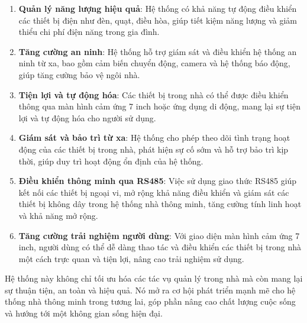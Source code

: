 \begin{enumerate}
    \item \textbf{Quản lý năng lượng hiệu quả}: Hệ thống có khả năng tự động điều khiển các thiết bị điện như đèn, quạt, điều hòa, giúp tiết kiệm năng lượng và giảm thiểu chi phí điện năng trong gia đình.
    \item \textbf{Tăng cường an ninh}: Hệ thống hỗ trợ giám sát và điều khiển hệ thống an ninh từ xa, bao gồm cảm biến chuyển động, camera và hệ thống báo động, giúp tăng cường bảo vệ ngôi nhà.
    \item \textbf{Tiện lợi và tự động hóa}: Các thiết bị trong nhà có thể được điều khiển thông qua màn hình cảm ứng 7 inch hoặc ứng dụng di động, mang lại sự tiện lợi và tự động hóa cho người sử dụng.
    \item \textbf{Giám sát và bảo trì từ xa}: Hệ thống cho phép theo dõi tình trạng hoạt động của các thiết bị trong nhà, phát hiện sự cố sớm và hỗ trợ bảo trì kịp thời, giúp duy trì hoạt động ổn định của hệ thống.
    \item \textbf{Điều khiển thông minh qua RS485}: Việc sử dụng giao thức RS485 giúp kết nối các thiết bị ngoại vi, mở rộng khả năng điều khiển và giám sát các thiết bị không dây trong hệ thống nhà thông minh, tăng cường tính linh hoạt và khả năng mở rộng.
    \item \textbf{Tăng cường trải nghiệm người dùng}: Với giao diện màn hình cảm ứng 7 inch, người dùng có thể dễ dàng thao tác và điều khiển các thiết bị trong nhà một cách trực quan và tiện lợi, nâng cao trải nghiệm sử dụng.
\end{enumerate}

Hệ thống này không chỉ tối ưu hóa các tác vụ quản lý trong nhà mà còn mang lại sự thuận tiện, an toàn và hiệu quả. Nó mở ra cơ hội phát triển mạnh mẽ cho hệ thống nhà thông minh trong tương lai, góp phần nâng cao chất lượng cuộc sống và hướng tới một không gian sống hiện đại.
\newpage

